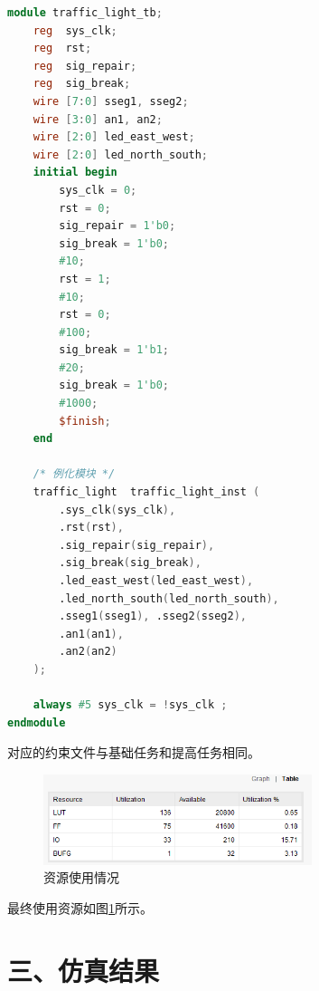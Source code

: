 \documentclass{article}
\newcommand{\fourhao}{\fontsize{14pt}{\baselineskip}\selectfont} %
\newcommand{\xiaosihao}{\fontsize{12pt}{\baselineskip}\selectfont} %
\begin{document}
\begin{lstlisting}[language=Verilog, caption={附加状态的仿真文件}]
module traffic_light_tb;
    reg  sys_clk;
    reg  rst;
    reg  sig_repair;
    reg  sig_break;
    wire [7:0] sseg1, sseg2;
    wire [3:0] an1, an2;
    wire [2:0] led_east_west;
    wire [2:0] led_north_south;
    initial begin
        sys_clk = 0;
        rst = 0;
        sig_repair = 1'b0;
        sig_break = 1'b0;
        #10;
        rst = 1;
        #10;
        rst = 0;
        #100;
        sig_break = 1'b1;
        #20;
        sig_break = 1'b0;
        #1000;
        $finish;
    end

    /* 例化模块 */
    traffic_light  traffic_light_inst (
        .sys_clk(sys_clk),
        .rst(rst),
        .sig_repair(sig_repair),
        .sig_break(sig_break),
        .led_east_west(led_east_west),
        .led_north_south(led_north_south),
        .sseg1(sseg1), .sseg2(sseg2),
        .an1(an1),
        .an2(an2)
    );

    always #5 sys_clk = !sys_clk ;
endmodule
\end{lstlisting}
对应的约束文件与基础任务和提高任务相同。
\begin{figure}[htbp]
    \centering
    \includegraphics[width=0.7\textwidth]{image/2024-06-19-17-27-19.png}
    \caption{资源使用情况}
    \label{image_utilize_1}
\end{figure}
最终使用资源如图\ref{image_utilize_1}所示。
\section*{\fourhao 三、仿真结果}
\xiaosihao
{}
\end{document}
